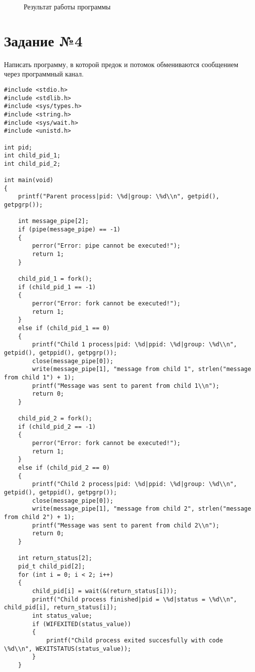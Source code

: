 \newpage

\begin{figure}[ph!]
	\caption{Результат работы программы}
\end{figure}

\section{Задание №4}
Написать программу, в которой предок и потомок обмениваются сообщением через программный канал.

\begin{lstlisting}[label=task_4,caption=Код к заданию №4]
#include <stdio.h>
#include <stdlib.h>
#include <sys/types.h>
#include <string.h>
#include <sys/wait.h>
#include <unistd.h>

int pid;
int child_pid_1;
int child_pid_2;

int main(void)
{
    printf("Parent process|pid: \%d|group: \%d\\n", getpid(), getpgrp());

    int message_pipe[2];
    if (pipe(message_pipe) == -1)
    {
        perror("Error: pipe cannot be executed!");
        return 1;
    }

    child_pid_1 = fork();
    if (child_pid_1 == -1)
    {
        perror("Error: fork cannot be executed!");
        return 1;
    }
    else if (child_pid_1 == 0)
    {
        printf("Child 1 process|pid: \%d|ppid: \%d|group: \%d\\n", getpid(), getppid(), getpgrp());
        close(message_pipe[0]);
        write(message_pipe[1], "message from child 1", strlen("message from child 1") + 1);
        printf("Message was sent to parent from child 1\\n");
        return 0;
    }

    child_pid_2 = fork();
    if (child_pid_2 == -1)
    {
        perror("Error: fork cannot be executed!");
        return 1;
    }
    else if (child_pid_2 == 0)
    {
        printf("Child 2 process|pid: \%d|ppid: \%d|group: \%d\\n", getpid(), getppid(), getpgrp());
        close(message_pipe[0]);
        write(message_pipe[1], "message from child 2", strlen("message from child 2") + 1);
        printf("Message was sent to parent from child 2\\n");
        return 0;
    }

    int return_status[2];
    pid_t child_pid[2];
    for (int i = 0; i < 2; i++)
    {
        child_pid[i] = wait(&(return_status[i]));
        printf("Child process finished|pid = \%d|status = \%d\\n", child_pid[i], return_status[i]);
        int status_value;
        if (WIFEXITED(status_value))
        {
            printf("Child process exited succesfully with code \%d\\n", WEXITSTATUS(status_value));
        }
    }


\end{lstlisting}
